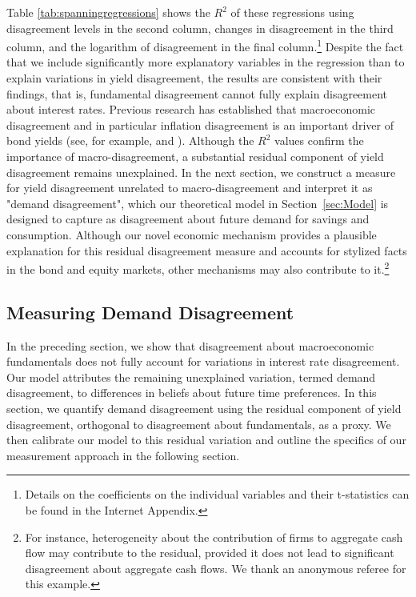 \documentclass[preprint,11pt,authoryear]{elsarticle}
\theoremstyle{plain}
\begin{document}
Table \ref{tab:spanningregressions} shows the $R^2$ of these regressions using disagreement levels in the second column, changes in disagreement in the third column, and the logarithm of disagreement in the final column.\footnote{Details on the coefficients on the individual variables and their t-statistics can be found in the Internet Appendix.} Despite the fact that we include significantly more explanatory variables in the regression than \cite{GiacolettiLaursenSingleton2021} to explain variations in yield disagreement, the results are consistent with their findings, that is, fundamental disagreement cannot fully explain disagreement about interest rates. Previous research has established that macroeconomic disagreement and in particular inflation disagreement is an important driver of bond yields (see, for example, \cite{xiong-yan-2010} and \cite{EGHI2017}). Although the $R^2$ values confirm the importance of macro-disagreement, a substantial residual component of yield disagreement remains unexplained. In the next section, we construct a measure for yield disagreement unrelated to macro-disagreement and interpret it as "demand disagreement", which our theoretical model in Section~\ref{sec:Model} is designed to capture as disagreement about future demand for savings and consumption. Although our novel economic mechanism provides a plausible explanation for this residual disagreement measure and accounts for stylized facts in the bond and equity markets, other mechanisms may also contribute to it.\footnote{For instance, heterogeneity about the contribution of firms to aggregate cash flow may contribute to the residual, provided it does not lead to significant disagreement about aggregate cash flows. We thank an anonymous referee for this example.}



\subsection{Measuring Demand Disagreement}\label{sec:measuredemanddis}

In the preceding section, we show that disagreement about macroeconomic fundamentals does not fully account for variations in interest rate disagreement. Our model attributes the remaining unexplained variation, termed demand disagreement, to differences in beliefs about future time preferences. In this section, we quantify demand disagreement using the residual component of yield disagreement, orthogonal to disagreement about fundamentals, as a proxy. We then calibrate our model to this residual variation and outline the specifics of our measurement approach in the following section.  
\end{document}
